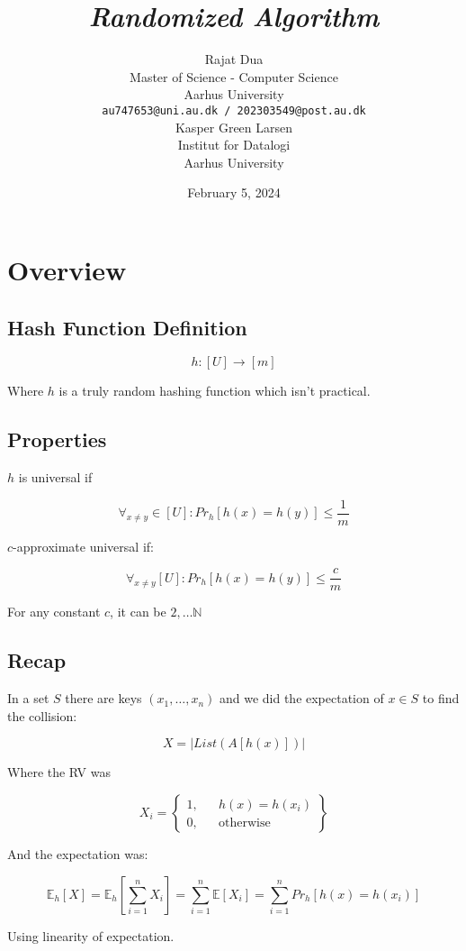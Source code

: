 \documentclass{article}
\title{\emph{Randomized Algorithm}}
\author{{\hspace{1mm}Rajat Dua} \\
	Master of Science - Computer Science\\
	Aarhus University\\
	\texttt{au747653@uni.au.dk / 202303549@post.au.dk} \\
	\And
	{\hspace{1mm}Kasper Green Larsen} \\
	Institut for Datalogi\\
	Aarhus University\\
}
\date{February 5, 2024}
\begin{document}
\maketitle
\vspace{-1cm}
\section{Overview}

\subsection{Hash Function Definition}

$$
h:[U] \rightarrow [m]
$$

Where $h$ is a truly random hashing function which isn't practical. 

\subsection{Properties}

$h$ is universal if

$$
\forall_{x\neq y} \in [U]: Pr_{h} [h(x) = h(y)] \leq \frac{1}{m}
$$

$c$-approximate universal if:

$$
\forall_{x\neq y}[U]: Pr_{h}[h(x) = h(y)] \leq \frac{c}{m}
$$

For any constant $c$, it can be $2, \ldots \mathbb N$

\subsection{Recap}

In a set $S$ there are keys $(x_1, \ldots, x_n)$ and we did the expectation of $x \in S$ to find the collision:

$$
X = |List(A[h(x)])|
$$

Where the RV was

$$
X_i = \left\{
\begin{matrix}
    1, && h(x) = h(x_i) \\
    0, && \text{otherwise}
\end{matrix}
\right\}
$$

And the expectation was:

$$
\mathbb E_h[X] = \mathbb E_h [\sum^{n}_{i=1} X_i] = \sum_{i=1}^{n} \mathbb E[X_i] = \sum_{i=1}^{n} Pr_{h}[h(x) = h(x_i)]
$$

Using linearity of expectation.
\end{document}

